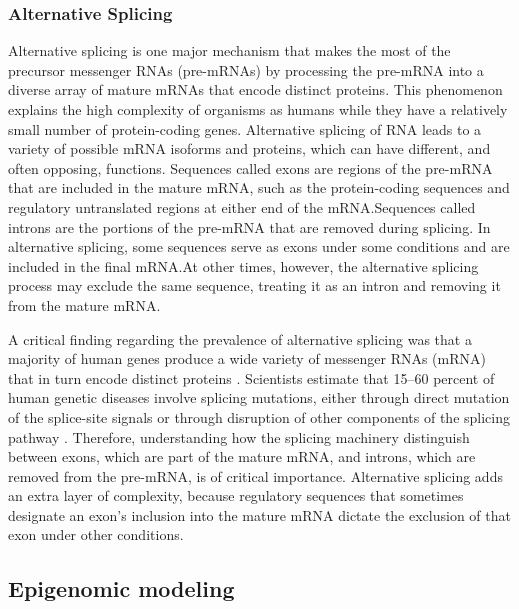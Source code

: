 \subsubsection{Alternative Splicing}

Alternative splicing is one major mechanism that makes the most of the precursor messenger RNAs (pre-mRNAs) by processing the pre-mRNA into a diverse array of mature mRNAs that encode distinct proteins. This phenomenon explains the high complexity of organisms as humans while they have a relatively small number of protein-coding genes. Alternative splicing of RNA leads to a variety of possible mRNA isoforms and proteins, which can have different, and often opposing, functions. Sequences called exons are regions of the pre-mRNA that are included in the mature mRNA, such as the protein-coding sequences and regulatory untranslated regions at either end of the mRNA.\@ Sequences called introns are the portions of the pre-mRNA that are removed during splicing. In alternative splicing, some sequences serve as exons under some conditions and are included in the final mRNA.\@ At other times, however, the alternative splicing process may exclude the same sequence, treating it as an intron and removing it from the mature mRNA.\@

\medskip

A critical finding regarding the prevalence of alternative splicing was that a majority of human genes produce a wide variety of messenger RNAs (mRNA) that in turn encode distinct proteins \cite{Johnson2003}. Scientists estimate that 15–60 percent of human genetic diseases involve splicing mutations, either through direct mutation of the splice-site signals or through disruption of other components of the splicing pathway \cite{Wang2007}. Therefore, understanding how the splicing machinery distinguish between exons, which are part of the mature mRNA, and introns, which are removed from the pre-mRNA, is of critical importance. Alternative splicing adds an extra layer of complexity, because regulatory sequences that sometimes designate an exon's inclusion into the mature mRNA dictate the exclusion of that exon under other conditions.


\subsection{Epigenomic modeling}

